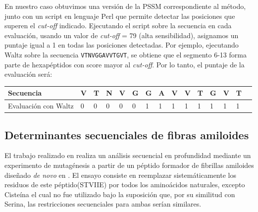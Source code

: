En nuestro caso obtuvimos una versión de la PSSM correspondiente al método, junto con un script en lenguaje Perl que permite detectar las posiciones que superen el \textit{cut-off} indicado.
Ejecutando el script sobre la secuencia en cada evaluación, usando un valor de \textit{cut-off} = 79 (alta sensibilidad), asignamos un puntaje igual a 1 en todas las posiciones detectadas.
Por ejemplo, ejecutando Waltz sobre la secuencia \texttt{VTNVGGAVVTGVT}, se obtiene que el segmento 6-13 forma parte de hexapéptidos con score mayor al \textit{cut-off}. Por lo tanto, el puntaje de la evaluación será:


\vspace{0.5cm}
\noindent
\begin{center}
\begin{tabular}{lllllllllllllll} 
\hline    
Secuencia & \textbf{V} & \textbf{T} & \textbf{N} & \textbf{V} & \textbf{G} & \textbf{G} & \textbf{A} & \textbf{V} & \textbf{V} &\textbf{T} & \textbf{G} & \textbf{V} & \textbf{T}  \\ \hline
Evaluación con Waltz & 0 & 0 & 0 & 0 & 0 & 1 & 1 & 1 & 1 & 1 & 1 & 1 & 1 \\ \hline
\end{tabular}
\end{center}







\subsection{Determinantes secuenciales de fibras amiloides}\label{determinantesSecuenciales}

El trabajo realizado en \cite{de2004sequence} realiza un análisis secuencial en  profundidad mediante un experimento de mutagénesis a partir de un péptido formador de fibrillas amiloides diseñado \textit{de novo} en \cite{de2002novo}. 
El ensayo consiste en reemplazar sistemáticamente los residuos de este péptido(STVIIE) por todos los aminoácidos naturales, excepto Cisteína el cual no fue utilizado bajo la suposición que, por su similitud con Serina, las restricciones 
secuenciales para ambas serían similares.



